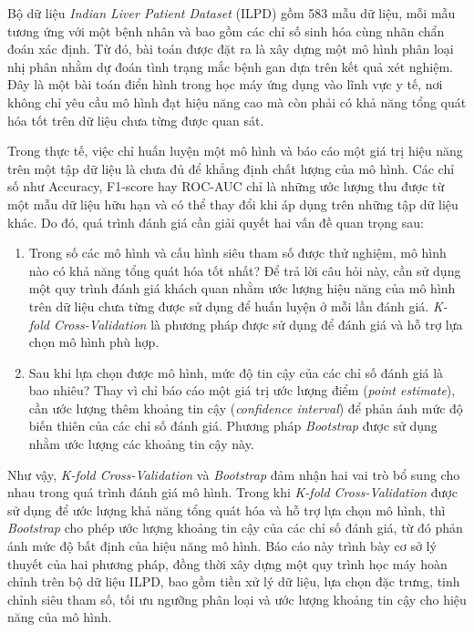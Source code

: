 \documentclass[14pt,a4paper]{extarticle}\usepackage[]{graphicx}\usepackage[]{xcolor}
\begin{document}
Bộ dữ liệu \emph{Indian Liver Patient Dataset} (ILPD) gồm 583 mẫu dữ liệu,
mỗi mẫu tương ứng với một bệnh nhân và bao gồm các chỉ số sinh hóa cùng nhãn
chẩn đoán xác định. Từ đó, bài toán được đặt ra là xây dựng một mô hình phân
loại nhị phân nhằm dự đoán tình trạng mắc bệnh gan dựa trên kết quả xét
nghiệm. Đây là một bài toán điển hình trong học máy ứng dụng vào lĩnh vực y
tế, nơi không chỉ yêu cầu mô hình đạt hiệu năng cao mà còn phải có khả năng
tổng quát hóa tốt trên dữ liệu chưa từng được quan sát.

Trong thực tế, việc chỉ huấn luyện một mô hình và báo cáo một giá trị hiệu
năng trên một tập dữ liệu là chưa đủ để khẳng định chất lượng của mô hình.
Các chỉ số như Accuracy, F1-score hay ROC-AUC chỉ là những ước lượng thu được
từ một mẫu dữ liệu hữu hạn và có thể thay đổi khi áp dụng trên những tập dữ
liệu khác. Do đó, quá trình đánh giá cần giải quyết hai vấn đề quan trọng sau:

\begin{enumerate}
    \item Trong số các mô hình và cấu hình siêu tham số được thử nghiệm, mô
    hình nào có khả năng tổng quát hóa tốt nhất? Để trả lời câu hỏi này, cần
    sử dụng một quy trình đánh giá khách quan nhằm ước lượng hiệu năng của mô
    hình trên dữ liệu chưa từng được sử dụng để huấn luyện ở mỗi lần đánh giá.
    \emph{K-fold Cross-Validation} là phương pháp được sử dụng để đánh giá và
    hỗ trợ lựa chọn mô hình phù hợp.

    \item Sau khi lựa chọn được mô hình, mức độ tin cậy của các chỉ số đánh
    giá là bao nhiêu? Thay vì chỉ báo cáo một giá trị ước lượng điểm
    (\emph{point estimate}), cần ước lượng thêm khoảng tin cậy
    (\emph{confidence interval}) để phản ánh mức độ biến thiên của các chỉ số
    đánh giá. Phương pháp \emph{Bootstrap} được sử dụng nhằm ước lượng các
    khoảng tin cậy này.
\end{enumerate}

Như vậy, \emph{K-fold Cross-Validation} và \emph{Bootstrap} đảm nhận hai vai
trò bổ sung cho nhau trong quá trình đánh giá mô hình. Trong khi
\emph{K-fold Cross-Validation} được sử dụng để ước lượng khả năng tổng quát
hóa và hỗ trợ lựa chọn mô hình, thì \emph{Bootstrap} cho phép ước lượng khoảng
tin cậy của các chỉ số đánh giá, từ đó phản ánh mức độ bất định của hiệu năng
mô hình. Báo cáo này trình bày cơ sở lý thuyết của hai phương pháp, đồng thời
xây dựng một quy trình học máy hoàn chỉnh trên bộ dữ liệu ILPD, bao gồm tiền
xử lý dữ liệu, lựa chọn đặc trưng, tinh chỉnh siêu tham số, tối ưu ngưỡng
phân loại và ước lượng khoảng tin cậy cho hiệu năng của mô hình.
\end{document}
